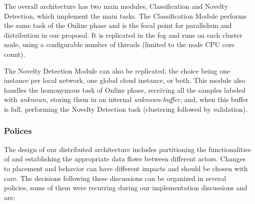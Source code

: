 

The overall \mfog architecture has two main modules, Classification and Novelty
Detection, which implement the \minas main tasks.
The Classification Module performs the same task of the \minas Online phase and
is the focal point for parallelism and distribution in our proposal.
It is replicated in the fog and runs on each cluster node, using a configurable
number of threads (limited to the node CPU core count).

The Novelty Detection Module can also be replicated,
the choice being one instance per local network, one global cloud instance,
or both.
This module also handles the homonymous task of \minas Online phase, receiving
all the samples labeled with \emph{unknown}, storing them in an internal
\emph{unknown-buffer}, and, when this buffer is full, performing the \minas
Novelty Detection task (clustering followed by validation).

\subsubsection{Polices}\label{sec:polices}

The design of our distributed \nd architecture includes partitioning the
functionalities of \minas and establishing the appropriate data flows
between different actors.
Changes to placement and behavior can have different impacts and should be
chosen with care.
The decisions following these discussions can be organized in several policies,
some of them were recurring during our implementation discussions and are:

